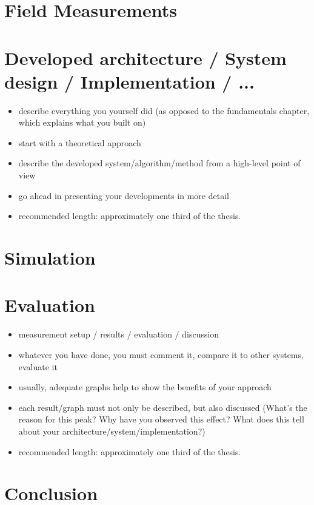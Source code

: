 \documentclass[]{nsm-thesis}
\begin{document}
\chapter{Field Measurements}


\chapter{Developed architecture / System design / Implementation / ...}


\begin{itemize}
\item describe everything you yourself did (as opposed to the fundamentals chapter, which explains what you built on)
\item start with a theoretical approach
\item describe the developed system/algorithm/method from a high-level point of view
\item go ahead in presenting your developments in more detail
\item recommended length: approximately one third of the thesis.
\end{itemize}

\chapter{Simulation}

\chapter{Evaluation}


\begin{itemize}
\item measurement setup / results / evaluation / discussion
\item whatever you have done, you must comment it, compare it to other systems, evaluate it
\item usually, adequate graphs help to show the benefits of your approach
\item each result/graph must not only be described, but also discussed (What's the reason for this peak? Why have you observed this effect? What does this tell about your architecture/system/implementation?)
\item recommended length: approximately one third of the thesis.
\end{itemize}



\chapter{Conclusion}
\end{document}

